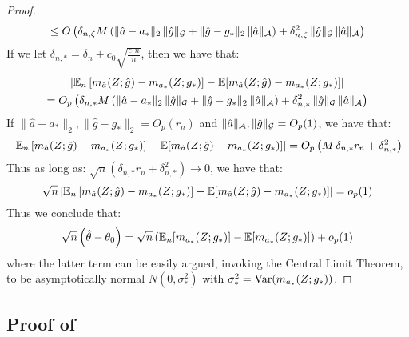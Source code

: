 \begin{proof}
\begin{multline}
     \leq O\left(\delta_{n,\zeta} M \left(\|\hat{a}-a_*\|_2\, \|\hat{g}\|_{{\mathcal G}} + \|\hat{g}-g_*\|_2\, \|\hat{a}\|_{{\mathcal A}}\right) + \delta_{n,\zeta}^2\, \|\hat{g}\|_{{\mathcal G}} \, \|\hat{a}\|_{{\mathcal A}}\right)
\end{multline}
If we let $\delta_{n,*} = \delta_n + c_0 \sqrt{\frac{c_1 n}{n}}$, then we have that:
\begin{multline}
    \left|\mathbb{E}_n\left[m_{\hat{a}}(Z; \hat{g}) - m_{a_*}(Z; g_*)\right] - \mathbb{E}[m_{\hat{a}}(Z; \hat{g}) - m_{a_*}(Z; g_*)]\right| \\
     = O_p\left(\delta_{n,*} M \left(\|\hat{a}-a_*\|_2\, \|\hat{g}\|_{{\mathcal G}} + \|\hat{g}-g_*\|_2\, \|\hat{a}\|_{{\mathcal A}}\right) + \delta_{n,*}^2\, \|\hat{g}\|_{{\mathcal G}} \, \|\hat{a}\|_{{\mathcal A}}\right)
\end{multline}
If $\|\hat{a} - a_*\|_2, \|\hat{g}-g_*\|_2= O_p(r_n)$ and $\|\hat{a}\|_{{\mathcal A}}, \|\hat{g}\|_{{\mathcal G}} = O_p(1)$, we have that:
\begin{equation}
    \left|\mathbb{E}_n\left[m_{\hat{a}}(Z; \hat{g}) - m_{a_*}(Z; g_*)\right] - \mathbb{E}[m_{\hat{a}}(Z; \hat{g}) - m_{a_*}(Z; g_*)]\right| 
     = O_p\left(M\, \delta_{n,*} r_n  + \delta_{n,*}^2\right)
\end{equation}
Thus as long as: $\sqrt{n}\left(\delta_{n, *} r_n + \delta_{n,*}^2\right) \to 0$, we have that:
\begin{equation}
    \sqrt{n}\left|\mathbb{E}_n\left[m_{\hat{a}}(Z; \hat{g}) - m_{a_*}(Z; g_*)\right] - \mathbb{E}[m_{\hat{a}}(Z; \hat{g}) - m_{a_*}(Z; g_*)]\right| 
     = o_p(1)
\end{equation}
Thus we conclude that:
\begin{align}
    \sqrt{n}\left(\hat{\theta} - \theta_0\right) = \sqrt{n} \left(\mathbb{E}_n[m_{a_*}(Z; g_*)] - \mathbb{E}[m_{a_*}(Z; g_*)]\right) + o_p(1)
\end{align}
where the latter term can be easily argued, invoking the Central Limit Theorem, to be asymptotically normal $N(0, \sigma_*^2)$ with $\sigma_*^2 =\text{Var}(m_{a_*}(Z; g_*))$.
\end{proof}


\subsection{Proof of }


